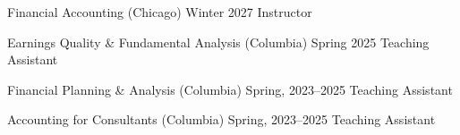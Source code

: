 

\begin{cventries}

\cventrysimple
    {Financial Accounting (Chicago)}  %
    {Winter 2027} %
    {Instructor}

\cventrysimple
    {Earnings Quality \& Fundamental Analysis (Columbia)}  %
    {Spring 2025} %
    {Teaching Assistant}
	
\cventrysimple
    {Financial Planning \& Analysis (Columbia)}  %
    {Spring, 2023--2025} %
    {Teaching Assistant}
	
\cventrysimple
	{Accounting for Consultants (Columbia)}  %
    {Spring, 2023--2025} %
    {Teaching Assistant}
    
\end{cventries}
